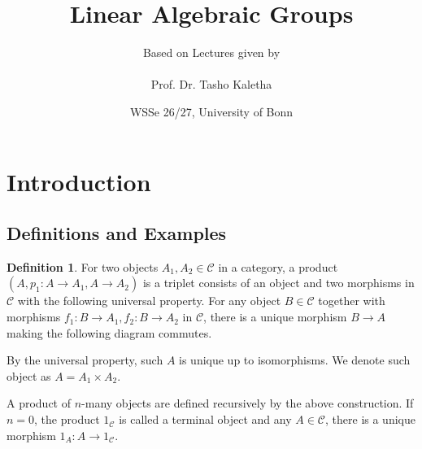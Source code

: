 \documentclass[10pt]{article}
\title{Linear Algebraic Groups}
\author{Based on Lectures given by\\\\Prof. Dr. Tasho Kaletha}
\date{WSSe 26/27, University of Bonn}
\numberwithin{equation}{section}
\theoremstyle{definition}
\newtheorem{definition}{Definition}[section]
\newtheorem{remark}{Remark}[section]
\newtheorem{example}{Example}[section]
\DeclareMathOperator{\GL}{GL}
\newcommand{\sC}[0]{\mathscr{C}}
\begin{document}
\maketitle

\section{Introduction}


\subsection{Definitions and Examples}

\begin{definition}
    For two objects $A_1,A_2\in\sC$ in a category, a product $(A,p_1:A\to A_1,A\to A_2)$ is a triplet consists of an object and two morphisms in $\sC$ with the following universal property. 
    For any object $B\in\sC$ together with morphisms $f_1:B\to A_1,f_2:B\to A_2$ in $\sC$, there is a unique morphism $B\to A$ making the following diagram commutes.
    \begin{center}
    \end{center}
    By the universal property, such $A$ is unique up to isomorphisms. We denote such object as $A = A_1\times A_2$.
    \par A product of $n$-many objects are defined recursively by the above construction. If $n=0$, the product $1_\sC$ is called a terminal object and any $A\in\sC$, there is a unique morphism $1_A:A\to 1_\sC$. %
\end{definition}
\end{document}
